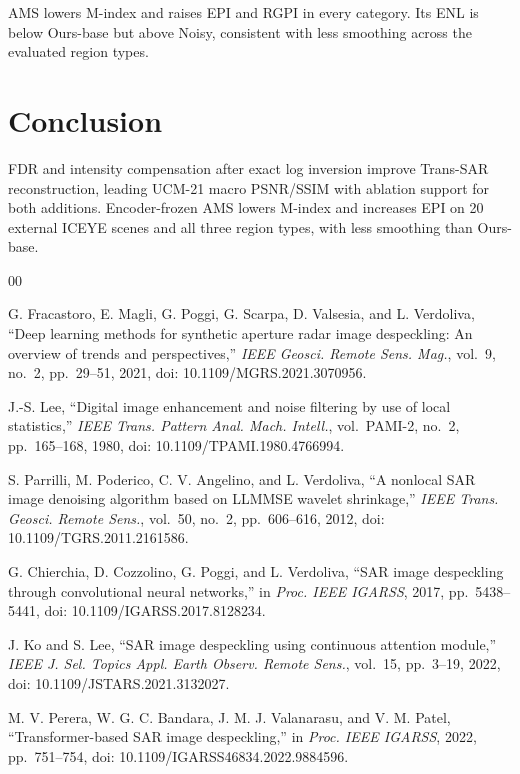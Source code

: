\documentclass[journal]{IEEEtran}
\newcommand{\rev}[1]{{\color{RevisionBlue}#1}}
\newcommand{\condensed}[1]{{\color{CondensedGreen}#1}}
\newcommand{\rev}[1]{#1}
\newcommand{\condensed}[1]{#1}
\begin{document}
\rev{AMS lowers M-index and raises EPI and RGPI in every category. Its ENL is below Ours-base but above Noisy, consistent with less smoothing across the evaluated region types.}

\section{Conclusion}
\condensed{FDR and intensity compensation after exact log inversion improve Trans-SAR reconstruction, leading UCM-21 macro PSNR/SSIM with ablation support for both additions. \rev{Encoder-frozen AMS lowers M-index and increases EPI on 20 external ICEYE scenes and all three region types, with less smoothing than Ours-base.}}

\begin{thebibliography}{00}

G. Fracastoro, E. Magli, G. Poggi, G. Scarpa, D. Valsesia, and L. Verdoliva, ``Deep learning methods for synthetic aperture radar image despeckling: An overview of trends and perspectives,'' \emph{IEEE Geosci. Remote Sens. Mag.}, vol.~9, no.~2, pp.~29--51, 2021, doi: 10.1109/MGRS.2021.3070956.

J.-S. Lee, ``Digital image enhancement and noise filtering by use of local statistics,'' \emph{IEEE Trans. Pattern Anal. Mach. Intell.}, vol.~PAMI-2, no.~2, pp.~165--168, 1980, doi: 10.1109/TPAMI.1980.4766994.

S. Parrilli, M. Poderico, C. V. Angelino, and L. Verdoliva, ``A nonlocal SAR image denoising algorithm based on LLMMSE wavelet shrinkage,'' \emph{IEEE Trans. Geosci. Remote Sens.}, vol.~50, no.~2, pp.~606--616, 2012, doi: 10.1109/TGRS.2011.2161586.

G. Chierchia, D. Cozzolino, G. Poggi, and L. Verdoliva, ``SAR image despeckling through convolutional neural networks,'' in \emph{Proc. IEEE IGARSS}, 2017, pp.~5438--5441, doi: 10.1109/IGARSS.2017.8128234.

J. Ko and S. Lee, ``SAR image despeckling using continuous attention module,'' \emph{IEEE J. Sel. Topics Appl. Earth Observ. Remote Sens.}, vol.~15, pp.~3--19, 2022, doi: 10.1109/JSTARS.2021.3132027.

M. V. Perera, W. G. C. Bandara, J. M. J. Valanarasu, and V. M. Patel, ``Transformer-based SAR image despeckling,'' in \emph{Proc. IEEE IGARSS}, 2022, pp.~751--754, doi: 10.1109/IGARSS46834.2022.9884596.


\end{thebibliography}
\end{document}
